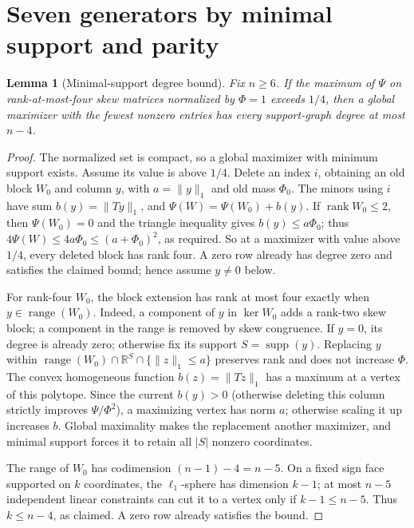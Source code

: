 \documentclass[11pt]{article}
\newtheorem{lemma}[theorem]{Lemma}
\newcommand{\R}{\mathbb R}
\newcommand{\supp}{\operatorname{supp}}
\begin{document}
\section{Seven generators by minimal support and parity}
\begin{lemma}[Minimal-support degree bound]\label{lem:degree}
Fix $n\geq6$. If the maximum of $\Psi$ on rank-at-most-four skew matrices normalized by $\Phi=1$ exceeds $1/4$, then a global maximizer with the fewest nonzero entries has every support-graph degree at most $n-4$.
\end{lemma}
\begin{proof}
The normalized set is compact, so a global maximizer with minimum support exists. Assume its value is above $1/4$. Delete an index $i$, obtaining an old block $W_0$ and column $y$, with $a=\|y\|_1$ and old mass $\Phi_0$. The minors using $i$ have sum $b(y)=\|Ty\|_1$, and $\Psi(W)=\Psi(W_0)+b(y)$. If $\operatorname{rank}W_0\leq2$, then $\Psi(W_0)=0$ and the triangle inequality gives $b(y)\leq a\Phi_0$; thus $4\Psi(W)\leq4a\Phi_0\leq(a+\Phi_0)^2$, as required. So at a maximizer with value above $1/4$, every deleted block has rank four. A zero row already has degree zero and satisfies the claimed bound; hence assume $y\ne0$ below.

For rank-four $W_0$, the block extension has rank at most four exactly when $y\in\operatorname{range}(W_0)$. Indeed, a component of $y$ in $\ker W_0$ adds a rank-two skew block; a component in the range is removed by skew congruence. If $y=0$, its degree is already zero; otherwise fix its support $S=\supp(y)$. Replacing $y$ within $\operatorname{range}(W_0)\cap\R^S\cap\{\|z\|_1\leq a\}$ preserves rank and does not increase $\Phi$. The convex homogeneous function $b(z)=\|Tz\|_1$ has a maximum at a vertex of this polytope. Since the current $b(y)>0$ (otherwise deleting this column strictly improves $\Psi/\Phi^2$), a maximizing vertex has norm $a$; otherwise scaling it up increases $b$. Global maximality makes the replacement another maximizer, and minimal support forces it to retain all $|S|$ nonzero coordinates.

The range of $W_0$ has codimension $(n-1)-4=n-5$. On a fixed sign face supported on $k$ coordinates, the $\ell_1$-sphere has dimension $k-1$; at most $n-5$ independent linear constraints can cut it to a vertex only if $k-1\leq n-5$. Thus $k\leq n-4$, as claimed. A zero row already satisfies the bound.
\end{proof}
\end{document}
